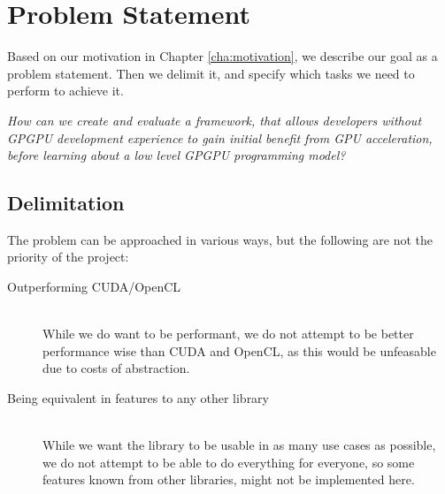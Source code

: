 \section{Problem Statement}
Based on our motivation in Chapter \ref{cha:motivation}, we describe our goal as a problem statement. Then we delimit it, and specify which tasks we need to perform to achieve it.

\textit{How can we create and evaluate a framework, that allows developers without GPGPU development experience to gain initial benefit from GPU acceleration, before learning about a low level GPGPU programming model?}

\subsection{Delimitation}
The problem can be approached in various ways, but the following are not the priority of the project:
\begin{description}
\item[Outperforming CUDA/OpenCL] \hfill \\
While we do want to be performant, we do not attempt to be better performance wise than CUDA and OpenCL, as this would be unfeasable due to costs of abstraction.
\item[Being equivalent in features to any other library] \hfill \\
While we want the library to be usable in as many use cases as possible, we do not attempt to be able to do everything for everyone, so some features known from other libraries, might not be implemented here.
\end{description}

